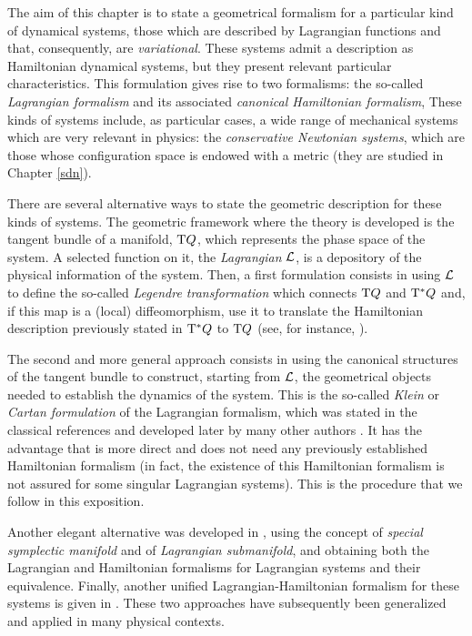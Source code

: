 \documentclass[12pt]{report}
\def\Lag{{\cal L}}
\def\Tan{{\rm T}}
\begin{document}
The aim of this chapter is to state a geometrical formalism 
for a particular kind of dynamical systems, those which are described by
Lagrangian functions and that, consequently, are {\sl variational}.
These systems admit a description as Hamiltonian dynamical systems,
but they present relevant particular characteristics.
This formulation gives rise to two formalisms: the so-called {\sl Lagrangian formalism} 
and its associated {\sl canonical Hamiltonian formalism},
These kinds of systems include, as particular cases, a wide range of mechanical systems
which are very relevant in physics: the {\sl conservative Newtonian systems}, 
which are those whose configuration space is endowed with a metric
(they are studied in Chapter \ref{sdn}).

There are several alternative ways to state the geometric description for these kinds of systems. 
The geometric framework where the theory is developed is the tangent bundle of a manifold, $\Tan Q$,
which represents the phase space of the system.
A selected function on it, the {\sl Lagrangian} $\Lag$, 
is a depository of the physical information of the system.
Then, a first formulation consists in using $\Lag$ to define the so-called
{\sl Legendre transformation} which connects $\Tan Q$ and $\Tan^* Q$
and, if this map is a (local) diffeomorphism, use it to translate the Hamiltonian description previously stated in $\Tan^*Q$ to $\Tan Q$ (see, for instance, \cite{AM-78}).

The second and more general approach consists in using the canonical structures of the tangent bundle
to construct, starting from $\Lag$, the geometrical objects needed to establish the dynamics of the system.
This is the so-called {\sl Klein} or {\sl Cartan formulation} of the Lagrangian formalism, which was stated in the classical references
\cite{Ga-52,Go-69,Grif-72a,Grif-72b,klein} and developed later by many other authors 
\cite{CMSVZ-76,Cr-81,Cr-83b,CP-adg,dLe89,SCC-84}.
It has the advantage that is more direct and
does not need any previously established Hamiltonian formalism
(in fact, the existence of this Hamiltonian formalism is not 
assured  for some singular Lagrangian systems).
This is the procedure that we follow in this exposition.

Another elegant alternative was developed in \cite{Tu-76a,Tu-76b},
using the concept of {\sl special symplectic manifold} and of
{\sl Lagrangian submanifold}, and obtaining both the Lagrangian and Hamiltonian formalisms
for Lagrangian systems and their equivalence.
Finally, another unified Lagrangian-Hamiltonian formalism for these systems
is given in \cite{SR-83}. 
These two approaches have subsequently been generalized 
and applied in many physical contexts.
\end{document}
